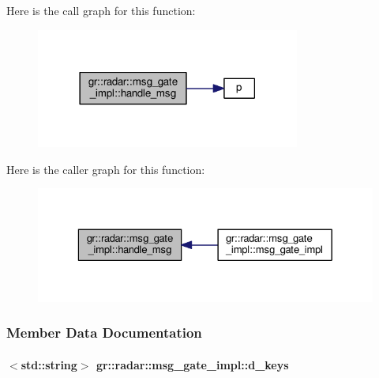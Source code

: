 Here is the call graph for this function\+:
\nopagebreak
\begin{figure}[H]
\begin{center}
\leavevmode
\includegraphics[width=246pt]{d5/d1f/classgr_1_1radar_1_1msg__gate__impl_a1ba15655dedeb03b0374f9498dc80222_cgraph}
\end{center}
\end{figure}




Here is the caller graph for this function\+:
\nopagebreak
\begin{figure}[H]
\begin{center}
\leavevmode
\includegraphics[width=329pt]{d5/d1f/classgr_1_1radar_1_1msg__gate__impl_a1ba15655dedeb03b0374f9498dc80222_icgraph}
\end{center}
\end{figure}




\subsubsection{Member Data Documentation}
\paragraph[{d\+\_\+keys}]{$<${\bf std\+::string}$>$ gr\+::radar\+::msg\+\_\+gate\+\_\+impl\+::d\+\_\+keys}\label{classgr_1_1radar_1_1msg__gate__impl_a8444abda0b51803266b47b6c7fc7aec9}


